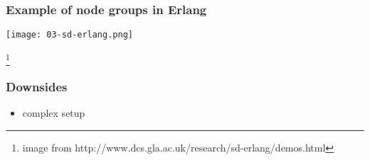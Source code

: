 \begin{frame}
    \frametitle{Example of node groups in Erlang}
    \begin{center}
        \texttt{[image: 03-sd-erlang.png]}
    \end{center}
    \footnote{image from http://www.dcs.gla.ac.uk/research/sd-erlang/demos.html}
\end{frame}

\begin{frame}
    \frametitle{Downsides}
    \begin{itemize}
        \item complex setup
    \end{itemize}
\end{frame}
